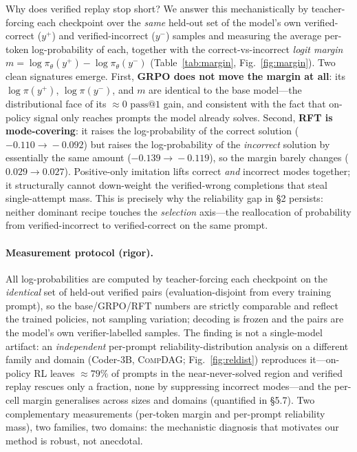 Why does verified replay stop short? We answer this mechanistically by
teacher-forcing each checkpoint over the \emph{same} held-out set of the model's
own verified-correct ($y^{+}$) and verified-incorrect ($y^{-}$) samples and
measuring the average per-token log-probability of each, together with the
correct-vs-incorrect \emph{logit margin} $m=\log\pi_\theta(y^{+})-\log\pi_\theta(y^{-})$
(Table~\ref{tab:margin}, Fig.~\ref{fig:margin}). Two clean signatures emerge.
First, \textbf{GRPO does not move the margin at all}: its $\log\pi(y^{+})$,
$\log\pi(y^{-})$, and $m$ are identical to the base model---the distributional
face of its $\approx\!0$ $\text{pass}@1$ gain, and consistent with the fact that
on-policy signal only reaches prompts the model already solves. Second,
\textbf{RFT is mode-covering}: it raises the log-probability of the correct
solution ($-0.110\!\to\!-0.092$) but raises the log-probability of the
\emph{incorrect} solution by essentially the same amount ($-0.139\!\to\!-0.119$),
so the margin barely changes ($0.029\!\to\!0.027$). Positive-only imitation lifts
correct \emph{and} incorrect modes together; it structurally cannot down-weight
the verified-wrong completions that steal single-attempt mass. This is precisely
why the reliability gap in \S2 persists: neither dominant recipe touches the
\emph{selection} axis---the reallocation of probability from verified-incorrect to
verified-correct on the same prompt.

\paragraph{Measurement protocol (rigor).} All log-probabilities are computed by
teacher-forcing each checkpoint on the \emph{identical} set of held-out verified
pairs (evaluation-disjoint from every training prompt), so the base/GRPO/RFT
numbers are strictly comparable and reflect the trained policies, not sampling
variation; decoding is frozen and the pairs are the model's own
verifier-labelled samples. The finding is not a single-model artifact: an
\emph{independent} per-prompt reliability-distribution analysis on a different
family and domain (Coder-3B, \textsc{CompDAG}; Fig.~\ref{fig:reldist}) reproduces
it---on-policy RL leaves $\approx\!79\%$ of prompts in the near-never-solved
region and verified replay rescues only a fraction, none by suppressing incorrect
modes---and the per-cell margin generalises across sizes and domains
(quantified in \S5.7). Two complementary measurements (per-token margin and
per-prompt reliability mass), two families, two domains: the mechanistic diagnosis
that motivates our method is robust, not anecdotal.


